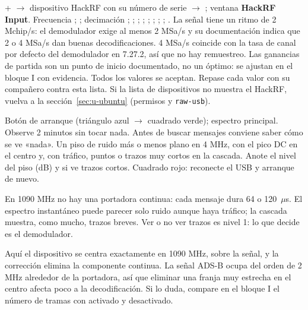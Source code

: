 {+ $\rightarrow$ dispositivo HackRF con su número de serie $\rightarrow$ ; ventana \textbf{HackRF Input}.}
{Frecuencia ;  ; decimación ;  ;  ;  ;  ;  ;  ;  ;  .}
{La señal tiene un ritmo de 2 Mchip/s: el demodulador exige al menos 2 MSa/s y su documentación indica que 2 o 4 MSa/s dan buenas decodificaciones. 4 MSa/s coincide con la tasa de canal por defecto del demodulador en 7.27.2, así que no hay remuestreo. Las ganancias de partida son un punto de inicio documentado, no un óptimo: se ajustan en el bloque I con evidencia.}
{Todos los valores se aceptan.}
{Repase cada valor con su compañero contra esta lista.}
{Si la lista de dispositivos no muestra el HackRF, vuelva a la sección~\ref{sec:u-ubuntu} (permisos y \texttt{raw-usb}).}

{Botón de arranque (triángulo azul $\rightarrow$ cuadrado verde); espectro principal.}
{Observe 2 minutos sin tocar nada.}
{Antes de buscar mensajes conviene saber cómo se ve «nada».}
{Un piso de ruido más o menos plano en 4 MHz, con el pico DC en el centro y, con tráfico, puntos o trazos muy cortos en la cascada.}
{Anote el nivel del piso (dB) y si ve trazos cortos.}
{Cuadrado rojo: reconecte el USB y arranque de nuevo.}

\begin{esperado}
En 1090 MHz no hay una portadora continua: cada mensaje dura 64 o 120~$\mu$s. El espectro instantáneo puede parecer solo ruido aunque haya tráfico; la cascada muestra, como mucho, trazos breves. Ver o no ver trazos es nivel 1: lo que decide es el demodulador.
\end{esperado}

\begin{nota}
Aquí el dispositivo se centra exactamente en 1090 MHz, sobre la señal, y la corrección  elimina la componente continua. La señal ADS-B ocupa del orden de 2 MHz alrededor de la portadora, así que eliminar una franja muy estrecha en el centro afecta poco a la decodificación. Si lo duda, compare en el bloque I el número de tramas con  activado y desactivado.
\end{nota}

